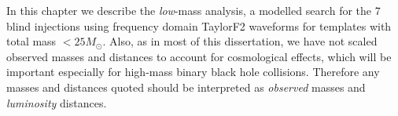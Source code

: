% 
% 


In this chapter we describe the {\it low}-mass \ihope{} analysis,
a modelled search for the 7 blind injections using 
frequency domain TaylorF2 waveforms for templates with total mass $<25 
M_{\odot}$.
Also, as in most of this dissertation, we have not scaled observed 
masses and distances to account for 
cosmological effects, which will be important especially for high-mass binary 
black hole collisions. Therefore any masses and distances quoted should be 
interpreted as \emph{observed} masses and \emph{luminosity} distances.

